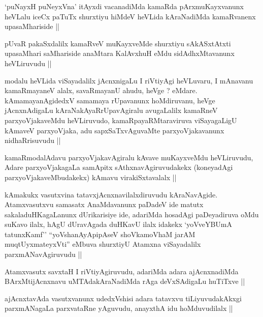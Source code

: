 \begin{artha}
`puNayxH puNeyxVna' itAyxdi vacanadiMda kamaRda pArxmuKayxvanunx
  heVLalu iceCx paTuTx shurxtiyu hiMdeV heVLida kAraNadiMda
  kamaRvanenx upasaMhariside ||
\end{artha}

\begin{artha}
pUvaR pakaSxdalilx kamaRveV muKayxveMde shurxtiyu sAkASxtAtxti
upasaMhari saMhariside anaMtara KalAvxhuH eMdu sidAdhxMtavanunx
heVLiruvudu ||
\end{artha}


\begin{artha}
modalu heVLida viSayadalilx jAcnxnigaLu I riVtiyAgi heVLuvaru, I
mAnavanu kamaRmayaneV alalx, savaRmayanU ahudu, heVge ?
eMdare. kAmamayanAgidedxV samamaya rUpavanunx hoMdiruvanu, heVge
jAcnxnAdigaLu kAraNakAyaRrUpavAgiralu avugaLalilx kamaRneV
parxyoVjakaveMdu heVLiruvudo, kamaRpayaRMtaraviruva viSayagaLigU
kAmaveV parxyoVjaka, adu sapxSaTxvAguvaMte parxyoVjakavanunx
nidhaRrisuvudu ||
\end{artha}

\begin{artha}
kamaRmodalAdavu parxyoVjakavAgiralu kAvave muKayxveMdu heVLiruvudu,
Adare parxyoVjakagaLa samApitx sAthxnavAgiruvudakekx (koneyadAgi
parxyoVjakaveMbudakekx) kAmavu virakiSxtavalalx ||
\end{artha}


\begin{artha}
kAmakukx vasutxvina tatavxjAcnxnavilalxdiruvudu
kAraNavAgide. Atamxvasutxvu samasatx AnaMdavanunx paDadeV ide matutx
sakaladuHKagaLanunx dUrikarisiye ide, adariMda hosadAgi paDeyadiruva 
oMdu suKavo ilalx, hAgU dUravAgada duHKavU ilalx idakekx `yoVveYBUmA
tatunxKamf'' ``yoV\s shanAyApipAseV shoVkamoVhaM jarAM
muqtUyxmateyxVti'' eMbuva shurxtiyU Atamxna viSayadalilx
parxmANavAgiruvudu ||
\end{artha}

\begin{artha}
Atamxvasutx savxtaH I riVtiyAgiruvudu, adariMda adara ajAcnxnadiMda
BArxMtijAcnxnavu uMTAdakAraNadiMda rAga deVxSAdigaLu huTiTxve ||
\end{artha}

\begin{artha}
ajAcnxtavAda vasutxvanunx udedxVshisi adara tatavxvu tiLiyuvudakAkxgi
parxmANagaLa parxvataRne yAguvudu, anayxthA idu hoMduvudilalx ||
\end{artha}

